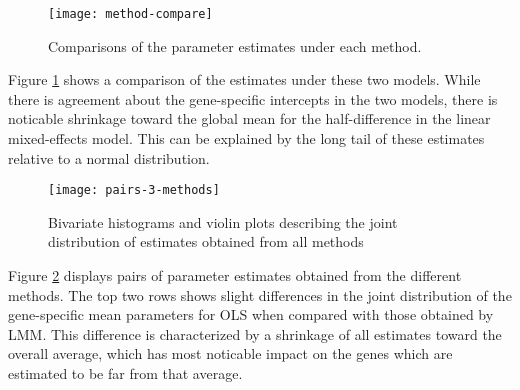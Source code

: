 \begin{figure}
\texttt{[image: method-compare]}
\caption{Comparisons of the parameter estimates under each method.}
\label{method-compare}
\end{figure}
Figure  \ref{method-compare} shows a comparison of the estimates under these two models. While there is agreement about the gene-specific intercepts in the two models, there is noticable shrinkage toward the global mean for the half-difference in the linear mixed-effects model. This can be explained by the long tail of these estimates relative to a normal distribution.

\begin{figure}
\texttt{[image: pairs-3-methods]}
\caption{Bivariate histograms and violin plots describing the joint distribution of estimates obtained from all methods}
\label{pairs-3-methods}
\end{figure}

Figure \ref{pairs-3-methods} displays pairs of parameter estimates obtained from the different methods. The top two rows shows slight differences in the joint distribution of the gene-specific mean parameters for OLS when compared with those obtained by LMM. This difference is characterized by a shrinkage of all estimates toward the overall average, which has most noticable impact on the genes which are estimated to be far from that average.






